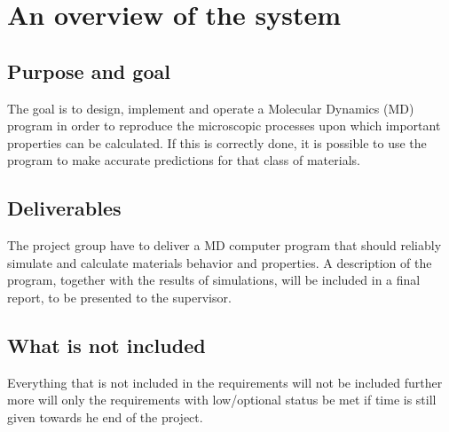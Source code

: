 \section{An overview of the system}
\subsection{Purpose and goal}
The goal is to design, implement and operate a Molecular Dynamics (MD) program in order to reproduce the microscopic processes upon which important properties can be calculated.
If this is correctly done, it is possible to use the program to make accurate predictions for that class of materials.

\subsection{Deliverables}
The project group have to deliver a  MD computer program that should reliably simulate and calculate materials behavior and properties.
A description of the program, together with the results of simulations, will be included in a final report, to be presented to the supervisor.

\subsection{What is not included}
Everything that is not included in the requirements will not be included further more will only the requirements with low/optional status be met if time is still given towards he end of the project.